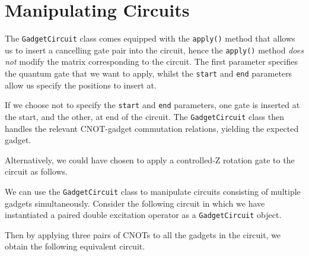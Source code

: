\section{Manipulating Circuits}

The \lstinline{GadgetCircuit} class comes equipped with the \lstinline{apply()} method that allows us to insert a cancelling gate pair into the circuit, hence the \lstinline{apply()} method \textit{does not} modify the matrix corresponding to the circuit. The first parameter specifies the quantum gate that we want to apply, whilst the \lstinline{start} and \lstinline{end} parameters allow us specify the positions to insert at. 


If we choose not to specify the \lstinline{start} and \lstinline{end} parameters, one gate is inserted at the start, and the other, at end of the circuit. The \lstinline{GadgetCircuit} class then handles the relevant CNOT-gadget commutation relations, yielding the expected gadget.


Alternatively, we could have chosen to apply a controlled-Z rotation gate to the circuit as follows.


We can use the \lstinline{GadgetCircuit} class to manipulate circuits consisting of multiple gadgets simultaneously. Consider the following circuit in which we have instantiated a paired double excitation operator as a \lstinline{GadgetCircuit} object.


Then by applying three pairs of CNOTs to all the gadgets in the circuit, we obtain the following equivalent circuit.


